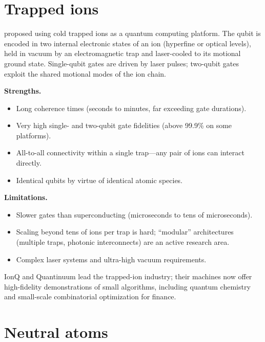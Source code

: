 \section{Trapped ions}

\citet{cirac_quantum_1995} proposed using cold trapped ions as a quantum computing platform. The qubit is encoded in two internal electronic states of an ion (hyperfine or optical levels), held in vacuum by an electromagnetic trap and laser-cooled to its motional ground state. Single-qubit gates are driven by laser pulses; two-qubit gates exploit the shared motional modes of the ion chain.

\textbf{Strengths.}
\begin{itemize}
\item Long coherence times (seconds to minutes, far exceeding gate durations).
\item Very high single- and two-qubit gate fidelities (above 99.9\% on some platforms).
\item All-to-all connectivity within a single trap---any pair of ions can interact directly.
\item Identical qubits by virtue of identical atomic species.
\end{itemize}

\textbf{Limitations.}
\begin{itemize}
\item Slower gates than superconducting (microseconds to tens of microseconds).
\item Scaling beyond tens of ions per trap is hard; ``modular'' architectures (multiple traps, photonic interconnects) are an active research area.
\item Complex laser systems and ultra-high vacuum requirements.
\end{itemize}

IonQ and Quantinuum lead the trapped-ion industry; their machines now offer high-fidelity demonstrations of small algorithms, including quantum chemistry and small-scale combinatorial optimization for finance.

\section{Neutral atoms}


